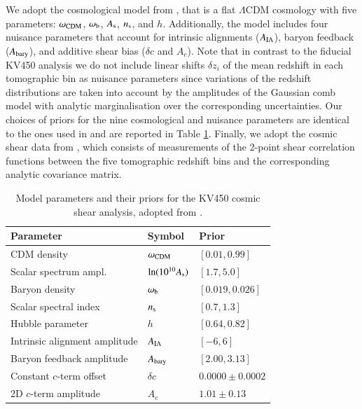 \documentclass{aa}
\begin{document}
We adopt the cosmological model from \cite{hildebrandt18}, that is a flat $\Lambda$CDM cosmology with five parameters: $\omega_{\rm CDM}$, $\omega_{\rm b}$, $A_{\rm s}$, $n_{\rm s}$, and $h$. Additionally, the model includes four nuisance parameters that account for intrinsic alignments ($A_{\rm IA}$), baryon feedback ($A_{\rm bary}$), and additive shear bias ($\delta c$ and $A_c$). Note that in contrast to the fiducial KV450 analysis we do not include linear shifts $\delta z_i$ of the mean redshift in each tomographic bin as nuisance parameters since variations of the redshift distributions are taken into account by the amplitudes of the Gaussian comb model with analytic marginalisation over the corresponding uncertainties. Our choices of priors for the nine cosmological and nuisance parameters are identical to the ones used in \cite{hildebrandt18} and are reported in Table \ref{tab:priors}. Finally, we adopt the cosmic shear data from \cite{hildebrandt18}, which consists of measurements of the 2-point shear correlation functions between the five tomographic redshift bins and the corresponding analytic covariance matrix.
\begin{table}
\caption{Model parameters and their priors for the KV450 cosmic shear analysis, adopted from \cite{hildebrandt18}.}
\begin{tabular}{lll}
\hline
Parameter & Symbol & Prior\\
\hline
CDM density & $\omega_{\rm CDM}$ & $[0.01, 0.99]$\\
Scalar spectrum ampl. & $\ln(10^{10}A_{\rm s})$ & $[1.7, 5.0]$\\
Baryon density & $\omega_{\rm b}$ & $[0.019, 0.026]$ \\
Scalar spectral index & $n_{\rm s}$ & $[0.7, 1.3]$ \\
Hubble parameter & $h$ & $[0.64, 0.82]$ \\
\hline
Intrinsic alignment amplitude & $A_{\rm IA}$ & $[-6, 6]$\\
Baryon feedback amplitude & $A_{\rm bary}$ & $[2.00, 3.13]$\\
Constant $c$-term offset & $\delta c$ & $0.0000\pm0.0002$ \\
2D $c$-term amplitude & $A_c$ & $1.01\pm0.13$\\
\hline
\end{tabular}
\label{tab:priors}
\end{table}
\end{document}
